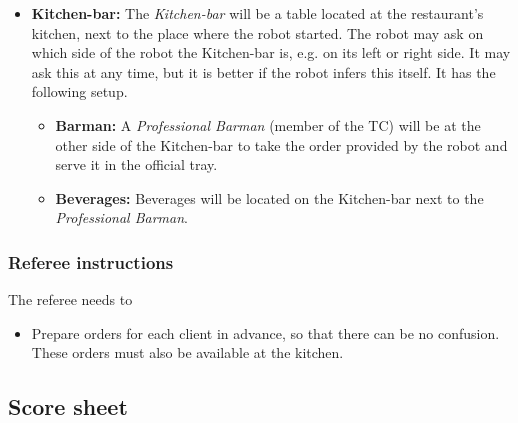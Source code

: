 \begin{itemize}
	\item \textbf{Kitchen-bar:} The \textit{Kitchen-bar} will be a table located at the restaurant's kitchen, next to the place where the robot started.
	The robot may ask on which side of the robot the Kitchen-bar is, e.g. on its left or right side. It may ask this at any time, but it is better if the robot infers this itself.
	It has the following setup.
	\begin{itemize}
		\item \textbf{Barman:} A \textit{Professional Barman} (member of the TC) will be at the other side of the Kitchen-bar to take the order provided by the robot and serve it in the official tray.
		\item \textbf{Beverages:} Beverages will be located on the Kitchen-bar next to the \textit{Professional Barman}.
	\end{itemize}

\end{itemize}


\subsubsection{Referee instructions}

The referee needs to
\begin{itemize}
  \item Prepare orders for each client in advance, so that there can be no confusion. These orders must also be available at the kitchen.
\end{itemize}



\newpage
\subsection{Score sheet}


